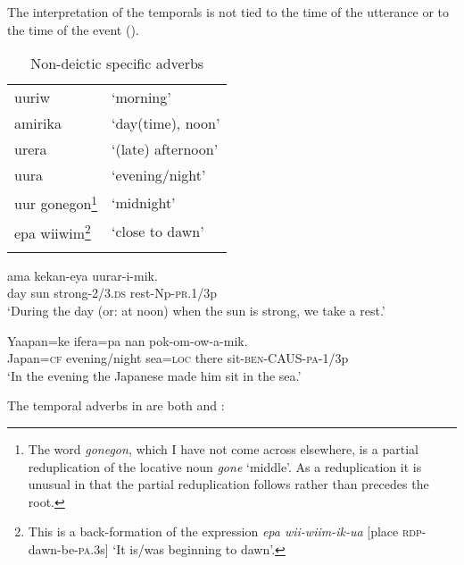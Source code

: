 The interpretation of the  temporals is not tied to the time of the utterance or to the time of the event (). 

\begin{table}
\begin{tabular}{ll}
\mytoprule
uuriw &`morning'\\
amirika &`day(time), noon'\\
urera &`(late) afternoon'\\
uura &`evening/night'\\
uur gonegon\footnote{The word \textit{gonegon}, which I have not come across elsewhere, is a partial reduplication of the locative noun \textit{gone} `middle'. As a reduplication it is unusual in that the partial reduplication follows rather than precedes the root.} &`midnight'\\
epa wiiwim\footnote{This is a back-formation of the expression \textit{epa wii-wiim-ik-ua} [place \textsc{rdp}-dawn-be-\textsc{pa}.3s] `It is/was beginning to dawn'.} &`close to dawn'\\
\mybottomrule 
\end{tabular}
\caption{Non-deictic specific adverbs}
\label{tab:3:nondeicticspecific}
\end{table}

\ea%
\label{ex:3:x698}
\gll {} ama kekan-eya uurar-i-mik. \\
day sun strong-2/3.\textsc{ds} rest-Np-\textsc{pr}.1/3p\\
\glt`During the day (or: at noon) when the sun is strong, we take a rest.'
\z

\ea%
\label{ex:3:x699}
\gll Yaapan=ke  ifera=pa nan pok-om-ow-a-mik. \\
Japan=\textsc{cf} evening/night sea=\textsc{loc} there sit-\textsc{ben}-CAUS-\textsc{pa}-1/3p\\
\glt`In the evening the Japanese made him sit in the sea.'
\z

The temporal adverbs in  are both  and :

